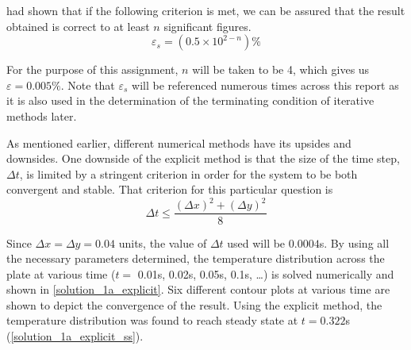 \documentclass[a4paper]{article}
\begin{document}
		\cite{Scarborough1966} had shown that if the following criterion is met, we can be assured that the result obtained is correct to at least $n$ significant figures.
		\begin{equation}
			\varepsilon_s = (0.5 \times 10^{2-n})\%
			\label{scarborough_formula}
		\end{equation}
		
		For the purpose of this assignment, $n$ will be taken to be 4, which gives us $\varepsilon = 0.005\%$. Note that $\varepsilon_s$ will be referenced numerous times across this report as it is also used in the determination of the terminating condition of iterative methods later. 
		
		As mentioned earlier, different numerical methods have its upsides and downsides. One downside of the explicit method is that the size of the time step, $\Delta t$, is limited by a stringent criterion \citep{Chapra2010} in order for the system to be both convergent and stable. That criterion for this particular question is
		\begin{equation}
			\Delta t
			\leq
			\frac{(\Delta x)^2 + (\Delta y)^2}{8}
			\label{dt_criterion_explicit}
		\end{equation}
		
		Since $\Delta x = \Delta y = 0.04$ units, the value of $\Delta t$ used will be $0.0004$s. By using all the necessary parameters determined, the temperature distribution across the plate at various time ($t =$ 0.01s, 0.02s, 0.05s, 0.1s, \dots) is solved numerically and shown in \autoref{solution_1a_explicit}. Six different contour plots at various time are shown to depict the convergence of the result. Using the explicit method, the temperature distribution was found to reach steady state at $t=0.322$s (\autoref{solution_1a_explicit_ss}).
		
\end{document}
